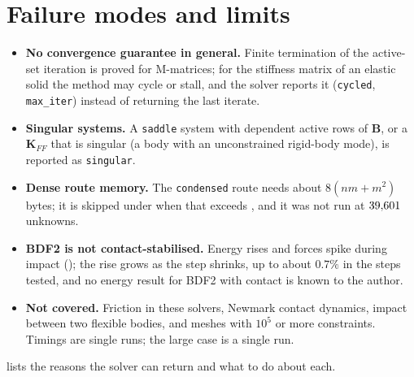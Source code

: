 \section{Failure modes and limits}\label{sec:ct-limits}

\begin{limitsbox}
\begin{itemize}
\item \textbf{No convergence guarantee in general.} Finite termination of the active-set iteration is proved for M-matrices; for the stiffness matrix of an elastic solid the method may cycle or stall, and the solver reports it (\texttt{cycled}, \texttt{max\_iter}) instead of returning the last iterate.
\item \textbf{Singular systems.} A \texttt{saddle} system with dependent active rows of $\bm B$, or a $\bm K_{FF}$ that is singular (a body with an unconstrained rigid-body mode), is reported as \texttt{singular}.
\item \textbf{Dense route memory.} The \texttt{condensed} route needs about $8(nm+m^2)$ bytes; it is skipped under  when that exceeds , and it was not run at $39{,}601$ unknowns.
\item \textbf{BDF2 is not contact-stabilised.} Energy rises and forces spike during impact (); the rise grows as the step shrinks, up to about $0.7\%$ in the steps tested, and no energy result for BDF2 with contact is known to the author.
\item \textbf{Not covered.} Friction in these solvers, Newmark contact dynamics, impact between two flexible bodies, and meshes with $10^5$ or more constraints. Timings are single runs; the large case is a single run.
\end{itemize}
\end{limitsbox}

 lists the reasons the solver can return and what to do about each.

